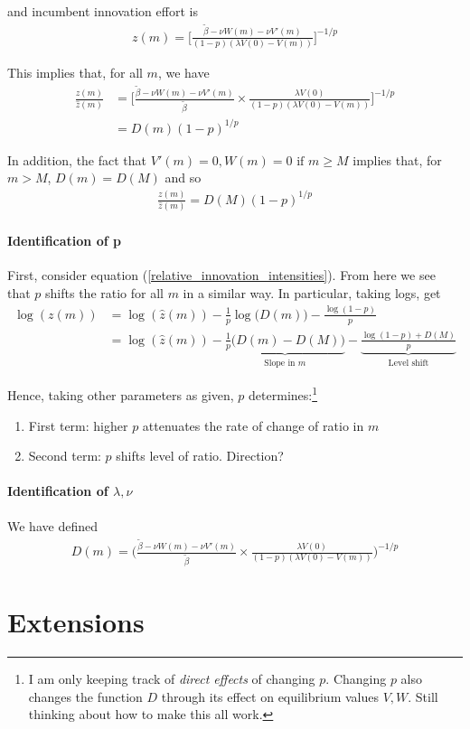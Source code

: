 \documentclass[12pt,english]{article}
\theoremstyle{remark}
\begin{document}
and incumbent innovation effort is
\begin{align*}
z(m) = \Big[ \frac{\tilde{\beta} - \nu W(m) - \nu V'(m)}{(1-p)(\lambda V(0) - V(m))} \Big]^{-1/p}
\end{align*}

This implies that, for all $m$, we have
\begin{align}
\frac{z(m)}{\hat{z}(m)} &= \Big[ \frac{\tilde{\beta} - \nu W(m) - \nu V'(m)}{\tilde{\beta}} \times \frac{\lambda V(0)}{(1-p)(\lambda V(0) - V(m))} \Big]^{-1/p} \label{relative_innovation_intensities} \\
 &= D(m) (1-p)^{1/p}
\end{align}

In addition, the fact that $V'(m) = 0,W(m) = 0 \text{ if } m \ge M$ implies that, for $m > M$, $D(m) = D(M)$ and so
\begin{align}
\frac{z(m)}{\hat{z}(m)} = D(M) (1-p)^{1/p}
\end{align}

\paragraph{Identification of p} 
First, consider equation (\ref{relative_innovation_intensities}). From here we see that $p$ shifts the ratio for all $m$ in a similar way. In particular, taking logs, get
\begin{align}
\log(z(m)) &= \log(\hat{z}(m)) - \frac{1}{p} \log \big( D(m) \big) - \frac{\log(1-p)}{p} \\
		   &= \log(\hat{z}(m)) - \underbrace{\frac{1}{p} \big(D(m) - D(M) \big)}_{\text{Slope in }m} - \underbrace{\frac{\log(1-p) + D(M)}{p}}_{\text{Level shift}}
\end{align}

Hence, taking other parameters as given, $p$ determines:\footnote{I am only keeping track of \textit{direct effects} of changing $p$. Changing $p$ also changes the function $D$ through its effect on equilibrium values $V,W$. Still thinking about how to make this all work.}
\begin{enumerate}
	\item First term: higher $p$ attenuates the rate of change of ratio in $m$
	\item Second term: $p$ shifts level of ratio. Direction?
\end{enumerate}

\paragraph{Identification of $\lambda,\nu$}
We have defined
\begin{align*}
D(m) = \Big( \frac{\tilde{\beta}-\nu W(m) - \nu V'(m)}{\tilde{\beta}} \times \frac{\lambda V(0)}{(1-p)(\lambda V(0) - V(m))} \Big)^{-1/p}
\end{align*}







\section{Extensions}
\end{document}
